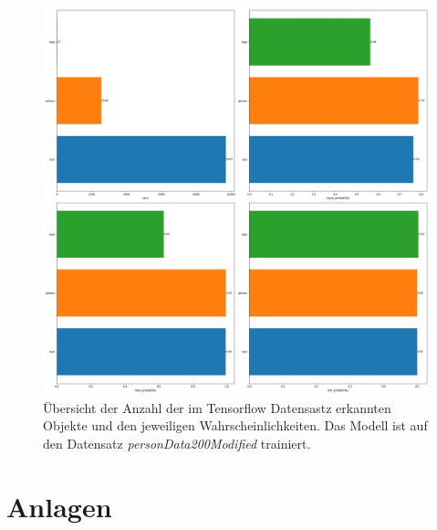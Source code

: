 \documentclass[a4paper,12pt,ngerman]{article}
\begin{document}
\newpage
\begin{figure}[ht]
\includegraphics[width=\linewidth]{Analyse_trainiert_(PersonData200Modified)}
\centering
\caption{Übersicht der Anzahl der im Tensorflow Datensastz erkannten Objekte und den jeweiligen Wahrscheinlichkeiten. Das Modell ist auf den Datensatz \textit{personData200Modified} trainiert.}
\end{figure}




\newpage
\section{Anlagen}
\end{document}
